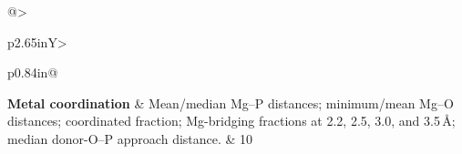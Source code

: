 \documentclass[11pt]{article}
\begin{document}
\begin{tabularx}{\textwidth}{@{}>{\raggedright\arraybackslash{}}p{2.65in}Y>{\raggedright\arraybackslash}p{0.84in}@{}}
\textbf{Metal coordination} & Mean/median Mg--P distances; minimum/mean Mg--O distances; coordinated fraction; Mg-bridging fractions at 2.2, 2.5, 3.0, and 3.5\,\AA; median donor-O--P approach distance. & 10 \\

\end{tabularx}
\end{document}
